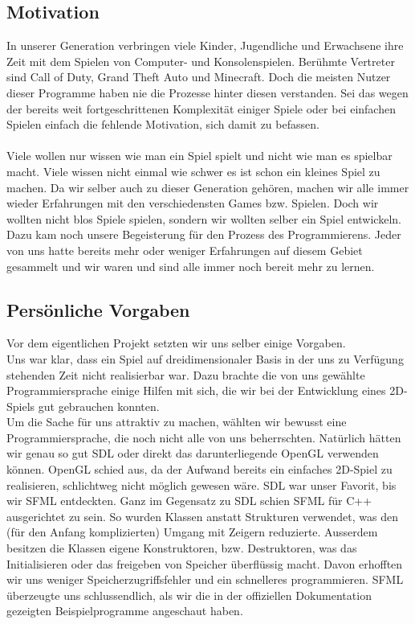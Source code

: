 \documentclass[12pt,a4paper]{scrartcl}
\begin{document}
\subsection{Motivation}
In unserer Generation verbringen viele Kinder, Jugendliche und Erwachsene
ihre Zeit mit dem Spielen von Computer- und Konsolenspielen.
Berühmte Vertreter sind Call of Duty, Grand Theft Auto und Minecraft.
Doch die meisten Nutzer dieser Programme haben nie die Prozesse hinter diesen verstanden.
Sei das wegen der bereits weit fortgeschrittenen Komplexität einiger Spiele
oder bei einfachen Spielen einfach die fehlende Motivation, sich damit zu befassen.\\
\\
Viele wollen nur wissen wie man ein Spiel spielt und nicht wie man es spielbar macht. Viele wissen nicht einmal wie schwer es ist schon ein
kleines Spiel zu machen.
Da wir selber auch zu dieser Generation gehören, 
machen wir alle immer wieder Erfahrungen mit den verschiedensten Games bzw. Spielen.
Doch wir wollten nicht blos Spiele spielen, 
sondern wir wollten selber ein Spiel entwickeln.
Dazu kam noch unsere Begeisterung für den Prozess des Programmierens.
Jeder von uns hatte bereits mehr oder weniger Erfahrungen auf diesem Gebiet gesammelt 
und wir waren und sind alle immer noch bereit mehr zu lernen.

\subsection{Persönliche Vorgaben}

Vor dem eigentlichen Projekt setzten wir uns selber einige Vorgaben.
\\
Uns war klar, dass ein Spiel auf dreidimensionaler Basis in der uns zu Verfügung stehenden Zeit nicht realisierbar war.
Dazu brachte die von uns gewählte Programmiersprache einige Hilfen mit sich, die wir bei der Entwicklung eines 2D-Spiels gut gebrauchen konnten.
\\
Um die Sache für uns attraktiv zu machen,
wählten wir bewusst eine Programmiersprache, die noch nicht
alle von uns beherrschten. Natürlich hätten wir genau so gut
SDL oder direkt das darunterliegende OpenGL verwenden können. OpenGL
schied aus, da der Aufwand bereits ein einfaches 2D-Spiel zu realisieren,
schlichtweg nicht möglich gewesen wäre. SDL war unser Favorit, bis wir
SFML entdeckten. Ganz im Gegensatz zu SDL schien SFML für C++ ausgerichtet
zu sein. So wurden Klassen anstatt Strukturen verwendet, was den (für den
Anfang komplizierten) Umgang mit Zeigern reduzierte. Ausserdem besitzen die
Klassen eigene Konstruktoren, bzw. Destruktoren, was das Initialisieren
oder das freigeben von Speicher überflüssig macht. Davon erhofften wir uns
weniger Speicherzugriffsfehler und ein schnelleres programmieren. SFML
überzeugte uns schlussendlich, als wir die in der offiziellen Dokumentation
gezeigten Beispielprogramme angeschaut haben.
\end{document}
